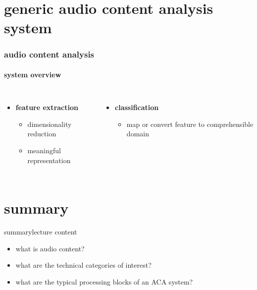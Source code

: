     \section[ACA]{generic audio content analysis system}
        \begin{frame}\frametitle{audio content analysis}\framesubtitle{system overview}
            \begin{figure}
                \centering
                
            \end{figure}
            
            \begin{columns}
                    \begin{itemize}
                        \item<2->[]	\textbf{feature extraction}
                                \begin{itemize}
                                    \item 	dimensionality reduction
                                    \item	meaningful representation
                                \end{itemize}
                    \end{itemize}
                    \begin{itemize}
                        \item<3->[]	\textbf{classification}
                                \begin{itemize}
                                    \item	map or convert feature to comprehensible domain
                                \end{itemize}
                    \end{itemize}
            \end{columns}
        \end{frame}

    \section{summary}
        \begin{frame}{summary}{lecture content}
            \begin{itemize}
                \item       what is audio content?
                \bigskip
                \item<2->   what are the technical categories of interest?
                \bigskip
                \item<3->   what are the typical processing blocks of an ACA system?
            \end{itemize}
        \end{frame}

